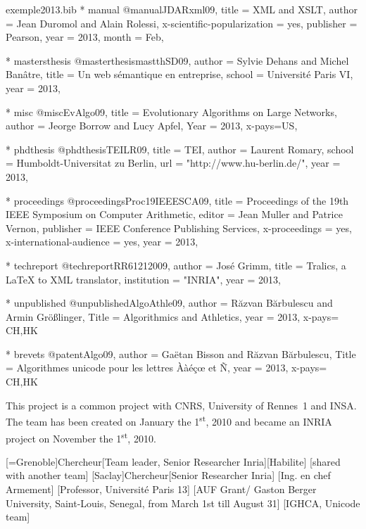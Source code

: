 \documentclass{ra2013}
\begin{document}
\begin{filecontents+}{exemple2013.bib}
    * manual
@manual{JDARxml09,
title = {XML and XSLT},
author = {Jean Duromol and Alain Rolessi}, 
x-scientific-popularization = {yes}, 
publisher = {Pearson}, 
year = 2013, 
month = {Feb}, 
}


    * mastersthesis
@masterthesis{mastthSD09,
author = {Sylvie Dehans and Michel Banâtre},
title = {Un web sémantique en entreprise}, 
school = {Université Paris VI}, 
year = 2013, 
}


    * misc
@misc{EvAlgo09,
title = {Evolutionary Algorithms on Large Networks}, 
author = {Jeorge Borrow and Lucy Apfel}, 
Year = 2013, 
x-pays={US},
}


    * phdthesis
@phdthesis{TEILR09,
title = {TEI},
author = {Laurent Romary},
school = {Humboldt-Universitat zu Berlin},
url =  "http://www.hu-berlin.de/",
year = 2013, 
}


    * proceedings
@proceedings{Proc19IEEESCA09,
title = {Proceedings of the 19th IEEE Symposium on Computer Arithmetic}, 
editor = {Jean Muller and Patrice Vernon}, 
publisher = {IEEE Conference Publishing Services}, 
x-proceedings = {yes}, 
x-international-audience = {yes}, 
year = 2013, 
}


    * techreport
@techreport{RR61212009,
author = {José Grimm},
title = {Tralics, a LaTeX to XML translator}, 
institution = "INRIA", 
year = 2013, 
}


    * unpublished
@unpublished{AlgoAthle09,
author = {R{\u{a}}zvan B{\u{a}}rbulescu and Armin Größlinger},
Title = {Algorithmics and Athletics},
year = 2013,
x-pays= {CH,HK}
}


   * brevets
@patent{Algo09,
author = {Gaëtan Bisson and Răzvan Bărbulescu},
Title = {Algorithmes unicode pour les lettres Ààéçœ et Ñ},
year = 2013,
x-pays= {CH,HK}
}


\end{filecontents+}

\maketitle


\begin{moreinfo}
  This project is a common project with CNRS, University of Rennes~1 and INSA. The
  team has been created on January the 1\textsuperscript{st}, 2010 and became an
  INRIA project on November the 1\textsuperscript{st}, 2010.
\end{moreinfo}

\begin{composition}

       [=Grenoble]{Chercheur}[Team leader, Senior Researcher Inria][Habilite]
       [shared with another team]
       [Saclay]{Chercheur}[Senior Researcher Inria]
       [Ing. en chef Armement]
       [Professor, Université Paris 13]
       [AUF Grant/ Gaston Berger University, Saint-Louis, Senegal, from March 1st till August 31]
       [IGHCA, Unicode team]
\end{composition}
\end{document}
